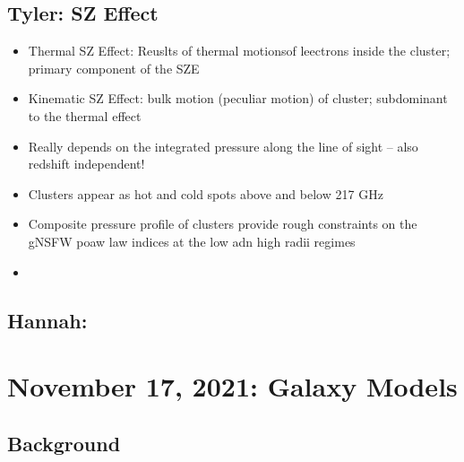 \documentclass{article}
\begin{document}
\subsection{Tyler: SZ Effect}

\begin{itemize}
    \item Thermal SZ Effect: Reuslts of thermal motionsof leectrons inside the cluster; primary component of the SZE
    \item Kinematic SZ Effect: bulk motion (peculiar motion) of cluster; subdominant to the thermal effect
    \item Really depends on the integrated pressure along the line of sight -- also redshift independent!
    \item Clusters appear as hot and cold spots above and below 217 GHz
    \item Composite pressure profile of clusters provide rough constraints on the gNSFW poaw law indices at the low adn high radii regimes
    \item 
\end{itemize}

\subsection{Hannah: }


\section{November 17, 2021: Galaxy Models}

\subsection{Background}
\end{document}
